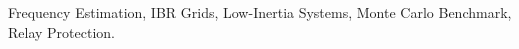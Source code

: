 \begin{IEEEkeywords}
Frequency Estimation, IBR Grids, Low-Inertia Systems, Monte Carlo Benchmark, Relay Protection.
\end{IEEEkeywords}
